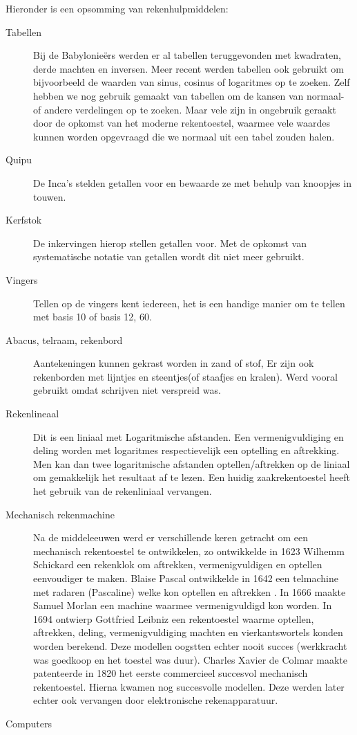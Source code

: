 \documentclass[../main.tex]{subfiles}
\begin{document}
\begin{solution}
Hieronder is een opsomming van rekenhulpmiddelen:
	\begin{description}
		\item[Tabellen] Bij de Babylonie\"ers werden er al tabellen teruggevonden met kwadraten, derde machten en inversen. Meer recent werden tabellen ook gebruikt om bijvoorbeeld de waarden van sinus, cosinus of logaritmes op te zoeken.
		Zelf hebben we nog gebruik gemaakt van tabellen om de kansen van normaal- of andere verdelingen op te zoeken. Maar vele zijn in ongebruik geraakt door de opkomst van het moderne rekentoestel, waarmee vele waardes kunnen worden opgevraagd die we normaal uit een tabel zouden halen.
		\item[Quipu] De Inca's stelden getallen voor en bewaarde ze met behulp van knoopjes in touwen.
		\item[Kerfstok] De inkervingen hierop stellen getallen voor. Met de opkomst van systematische notatie van getallen wordt dit niet meer gebruikt.
		\item[Vingers] Tellen op de vingers kent iedereen, het is een handige manier om te tellen met basis 10 of basis 12, 60.
		\item[Abacus, telraam, rekenbord] Aantekeningen kunnen gekrast worden in zand of stof, Er zijn ook rekenborden met lijntjes en steentjes(of staafjes en kralen). Werd vooral gebruikt omdat schrijven niet verspreid was.
		\item[Rekenlineaal] Dit is een liniaal met Logaritmische afstanden. Een vermenigvuldiging en deling worden met logaritmes respectievelijk een optelling en aftrekking. Men kan dan twee logaritmische afstanden optellen/aftrekken op de liniaal om gemakkelijk het resultaat af te lezen. Een huidig zaakrekentoestel heeft het gebruik van de rekenliniaal vervangen.
		\item[Mechanisch rekenmachine] Na de middeleeuwen werd er verschillende keren getracht om een mechanisch rekentoestel te ontwikkelen, zo ontwikkelde in 1623 Wilhemm Schickard een rekenklok om aftrekken, vermenigvuldigen en optellen eenvoudiger te maken. Blaise Pascal ontwikkelde in 1642 een telmachine met radaren (Pascaline) welke kon optellen en aftrekken . In 1666 maakte Samuel Morlan een machine waarmee vermenigvuldigd kon worden. In 1694 ontwierp Gottfried Leibniz een rekentoestel waarme optellen, aftrekken, deling, vermenigvuldiging machten en vierkantswortels konden worden berekend. Deze modellen oogstten echter nooit succes (werkkracht was goedkoop en het toestel was duur). Charles Xavier de Colmar maakte patenteerde in 1820 het eerste commercieel succesvol mechanisch rekentoestel. Hierna kwamen nog succesvolle modellen. Deze werden later echter ook vervangen door elektronische rekenapparatuur.
		\item[Computers]

	\end{description}
\end{solution}
\end{document}
